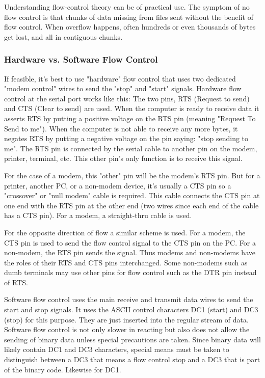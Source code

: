 \documentclass[11pt, twosides, titlepage]{article}
\begin{document}
            Understanding flow-control theory can be of practical use. The symptom of no flow control is that chunks of data missing from files sent without the benefit of flow control. When overflow happens, often hundreds or even thousands of bytes get lost, and all in contiguous chunks.

        \subsubsection{Hardware vs. Software Flow Control}

            If feasible, it's best to use "hardware" flow control that uses two dedicated "modem control" wires to send the "stop" and "start" signals. Hardware flow control at the serial port works like this: The two pins, RTS (Request to send) and CTS (Clear to send) are used. When the computer is ready to receive data it asserts RTS by putting a positive voltage on the RTS pin (meaning "Request To Send to me"). When the computer is not able to receive any more bytes, it negates RTS by putting a negative voltage on the pin saying: "stop sending to me". The RTS pin is connected by the serial cable to another pin on the modem, printer, terminal, etc. This other pin's only function is to receive this signal.

            For the case of a modem, this "other" pin will be the modem's RTS pin. But for a printer, another PC, or a non-modem device, it's usually a CTS pin so a "crossover" or "null modem" cable is required. This cable connects the CTS pin at one end with the RTS pin at the other end (two wires since each end of the cable has a CTS pin). For a modem, a straight-thru cable is used.
            
            For the opposite direction of flow a similar scheme is used. For a modem, the CTS pin is used to send the flow control signal to the CTS pin on the PC. For a non-modem, the RTS pin sends the signal. Thus modems and non-modems have the roles of their RTS and CTS pins interchanged. Some non-modems such as dumb terminals may use other pins for flow control such as the DTR pin instead of RTS.
            
            Software flow control uses the main receive and transmit data wires to send the start and stop signals. It uses the ASCII control characters DC1 (start) and DC3 (stop) for this purpose. They are just inserted into the regular stream of data. Software flow control is not only slower in reacting but also does not allow the sending of binary data unless special precautions are taken. Since binary data will likely contain DC1 and DC3 characters, special means must be taken to distinguish between a DC3 that means a flow control stop and a DC3 that is part of the binary code. Likewise for DC1. 
\end{document}
